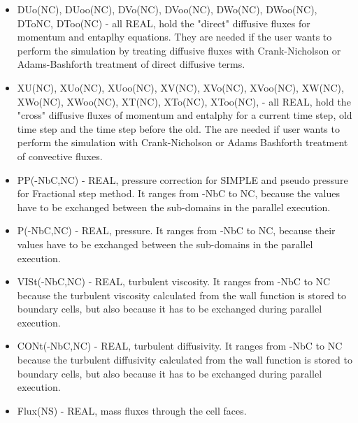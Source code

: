 \documentclass[10pt]{article}
\newcommand*{\tc}{\ttfamily} %
\begin{document}
\begin{itemize}
    \item
    {\tc DUo(NC)}, {\tc DUoo(NC)}, {\tc DVo(NC)}, {\tc DVoo(NC)}, 
    {\tc DWo(NC)}, {\tc DWoo(NC)}, {\tc DTo{NC}}, {\tc DToo(NC)}
      - all REAL, hold the "direct" diffusive fluxes for momentum
      and entaplhy 
      equations. They are needed if the user wants to perform the
      simulation by treating diffusive fluxes with Crank-Nicholson
      or Adams-Bashforth treatment of direct diffusive terms.

    \item
    {\tc XU(NC)}, {\tc XUo(NC)}, {\tc XUoo(NC)}, 
    {\tc XV(NC)}, {\tc XVo(NC)}, {\tc XVoo(NC)},
    {\tc XW(NC)}, {\tc XWo(NC)}, {\tc XWoo(NC)},
    {\tc XT(NC)}, {\tc XTo(NC)}, {\tc XToo(NC)}, - all REAL, 
      hold the "cross" 
      diffusive fluxes of momentum and entalphy for a current time step,  
      old time step and the time step before the old. The are needed
      if user wants to perform the simulation with Crank-Nicholson
      or Adams Bashforth treatment of convective fluxes.

    \item
    {\tc PP(-NbC,NC)} - REAL, pressure correction for SIMPLE and
      pseudo pressure for Fractional step method. It ranges from
      {\tc -NbC} to {\tc NC}, because the values have to be exchanged 
      between the sub-domains in the parallel execution.

    \item
    {\tc P(-NbC,NC)} - REAL, pressure. It ranges from {\tc -NbC} to 
      {\tc NC}, because their values have to be exchanged between
      the sub-domains in the parallel execution.

    \item
    {\tc VISt(-NbC,NC)} - REAL, turbulent viscosity. It ranges
      from {\tc -NbC} to {\tc NC} because the turbulent viscosity calculated
      from the wall function is stored to boundary cells, but also
      because it has to be exchanged during parallel execution.

    \item
    {\tc CONt(-NbC,NC)} - REAL, turbulent diffusivity. It ranges
      from {\tc -NbC} to {\tc NC} because the turbulent diffusivity calculated
      from the wall function is stored to boundary cells, but also
      because it has to be exchanged during parallel execution.

    \item
    {\tc Flux(NS)} - REAL, mass fluxes through the cell faces.


\end{itemize}
\end{document}
